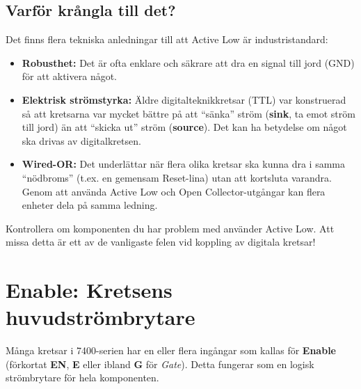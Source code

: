\documentclass[
  swedish,
  letterpaper,
  oneside,
  openany]{book}
\providecommand{\tightlist}{%
  \setlength{\itemsep}{0pt}\setlength{\parskip}{0pt}}
\begin{document}
\subsection{Varför krångla till det?}\label{sec-varfor-active-low}

Det finns flera tekniska anledningar till att Active Low är
industristandard:

\begin{itemize}
\tightlist
\item
  \textbf{Robusthet:} Det är ofta enklare och säkrare att dra en signal
  till jord (GND) för att aktivera något.
\item
  \textbf{Elektrisk strömstyrka:} Äldre digitalteknikkretsar (TTL) var
  konstruerad så att kretsarna var mycket bättre på att ``sänka'' ström
  (\textbf{sink}, ta emot ström till jord) än att ``skicka ut'' ström
  (\textbf{source}). Det kan ha betydelse om något ska drivas av
  digitalkretsen.
\item
  \textbf{Wired-OR:} Det underlättar när flera olika kretsar ska kunna
  dra i samma ``nödbroms'' (t.ex. en gemensam Reset-lina) utan att
  kortsluta varandra. Genom att använda Active Low och Open
  Collector-utgångar kan flera enheter dela på samma ledning.
\end{itemize}

\begin{tcolorbox}[enhanced jigsaw, arc=.35mm, bottomrule=.15mm, bottomtitle=1mm, breakable, colback=white, colbacktitle=quarto-callout-important-color!10!white, colframe=quarto-callout-important-color-frame, coltitle=black, left=2mm, leftrule=.75mm, opacityback=0, opacitybacktitle=0.6, rightrule=.15mm, title=\textcolor{quarto-callout-important-color}{\faExclamation}\hspace{0.5em}{Tips när du kopplar på breadboard eller felsöker din kretskortsdesign}, titlerule=0mm, toprule=.15mm, toptitle=1mm]

Kontrollera om komponenten du har problem med använder Active Low. Att
missa detta är ett av de vanligaste felen vid koppling av digitala
kretsar!

\end{tcolorbox}

\section{Enable: Kretsens huvudströmbrytare}\label{sec-enable}

Många kretsar i 7400-serien har en eller flera ingångar som kallas för
\textbf{Enable} (förkortat \textbf{EN}, \textbf{E} eller ibland
\textbf{G} för \emph{Gate}). Detta fungerar som en logisk strömbrytare
för hela komponenten.
\end{document}
